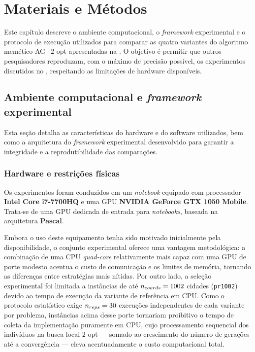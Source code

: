 \chapter{Materiais e Métodos}\label{cap3-materiais-metodos}

Este capítulo descreve o ambiente computacional, o \emph{framework} experimental e o protocolo de execução utilizados para comparar as quatro variantes do algoritmo memético AG+\(2\)-opt apresentadas na .
O objetivo é permitir que outros pesquisadores reproduzam, com o máximo de precisão possível, os experimentos discutidos no , respeitando as limitações de hardware disponíveis.

\section{Ambiente computacional e \emph{framework} experimental}\label{sec-31-ambiente-framework}

Esta seção detalha as características do hardware e do software utilizados, bem como a arquitetura do \emph{framework} experimental desenvolvido para garantir a integridade e a reprodutibilidade das comparações.

\subsection{Hardware e restrições físicas}\label{sec-311-hardware-software}

Os experimentos foram conduzidos em um \emph{notebook} equipado com processador \textbf{Intel Core i7-7700HQ} e uma GPU \textbf{NVIDIA GeForce GTX 1050 Mobile}.
Trata-se de uma GPU dedicada de entrada para \emph{notebooks}, baseada na arquitetura \textbf{Pascal}.

Embora o uso deste equipamento tenha sido motivado inicialmente pela disponibilidade, o conjunto experimental oferece uma vantagem metodológica: a combinação de uma CPU \emph{quad-core} relativamente mais capaz com uma GPU de porte modesto acentua o custo de comunicação e os limites de memória, tornando as diferenças entre estratégias mais nítidas.
Por outro lado, a seleção experimental foi limitada a instâncias de até \(n_{coords} = 1002\) cidades (\texttt{pr1002}) devido ao tempo de execução da variante de referência em CPU.
Como o protocolo estatístico exige \(n_{reps} = 30\) execuções independentes de cada variante por problema, instâncias acima desse porte tornariam proibitivo o tempo de coleta da implementação puramente em CPU, cujo processamento sequencial dos indivíduos na busca local \(2\)-opt --- somado ao crescimento do número de gerações até a convergência --- eleva acentuadamente o custo computacional total.


